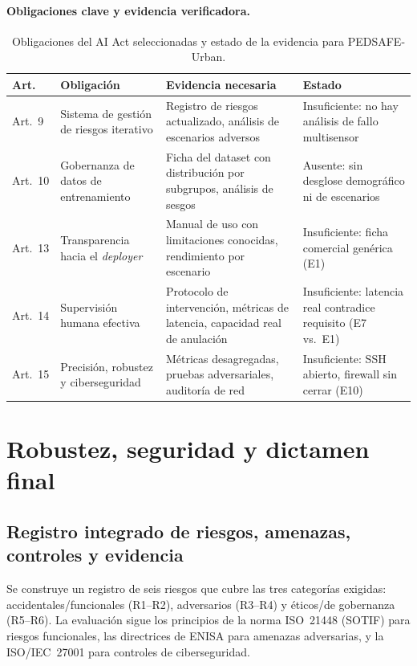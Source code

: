 \documentclass[11pt]{article}
\begin{document}
\paragraph{Obligaciones clave y evidencia verificadora.}

\begin{table}[h]
\centering\small
\begin{tabularx}{\textwidth}{l l X X}
\toprule
\textbf{Art.} & \textbf{Obligación} & \textbf{Evidencia necesaria} & \textbf{Estado} \\ \midrule
Art.~9 & Sistema de gestión de riesgos iterativo & Registro de riesgos actualizado, análisis de escenarios adversos & Insuficiente: no hay análisis de fallo multisensor \\ \addlinespace
Art.~10 & Gobernanza de datos de entrenamiento & Ficha del dataset con distribución por subgrupos, análisis de sesgos & Ausente: sin desglose demográfico ni de escenarios \\ \addlinespace
Art.~13 & Transparencia hacia el \textit{deployer} & Manual de uso con limitaciones conocidas, rendimiento por escenario & Insuficiente: ficha comercial genérica (E1) \\ \addlinespace
Art.~14 & Supervisión humana efectiva & Protocolo de intervención, métricas de latencia, capacidad real de anulación & Insuficiente: latencia real contradice requisito (E7 vs.\ E1) \\ \addlinespace
Art.~15 & Precisión, robustez y ciberseguridad & Métricas desagregadas, pruebas adversariales, auditoría de red & Insuficiente: SSH abierto, firewall sin cerrar (E10) \\ \bottomrule
\end{tabularx}
\caption{Obligaciones del AI Act seleccionadas y estado de la evidencia para PEDSAFE-Urban.}
\end{table}


\section{Robustez, seguridad y dictamen final}

\subsection{Registro integrado de riesgos, amenazas, controles y evidencia}

Se construye un registro de seis riesgos que cubre las tres categorías exigidas: accidentales/funcionales (R1--R2), adversarios (R3--R4) y éticos/de gobernanza (R5--R6). La evaluación sigue los principios de la norma ISO~21448 (SOTIF) \parencite{iso21448} para riesgos funcionales, las directrices de ENISA \parencite{enisa2021threat} para amenazas adversarias, y la ISO/IEC~27001 \parencite{iso27001} para controles de ciberseguridad.
\end{document}
